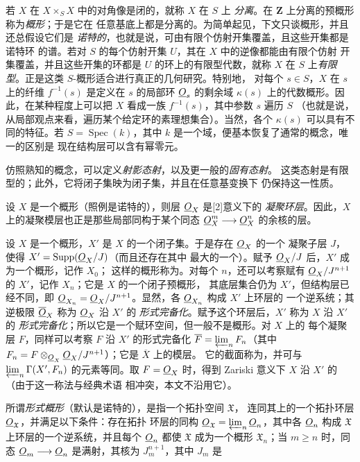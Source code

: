 若 $X$ 在 $X\times_S X$ 中的对角像是闭的，就称 $X$ 在 $S$ 上
\emph{分离}。在 $\mathbf Z$ 上分离的预概形称为\emph{概形}；于是它在
任意基底上都是分离的。为简单起见，下文只谈概形，并且还总假设它们是
\emph{诺特的}，也就是说，可由有限个仿射开集覆盖，且这些开集都是诺特环
的谱。若对 $S$ 的每个仿射开集 $U$，其在 $X$ 中的逆像都能由有限个仿射
开集覆盖，并且这些开集的环都是 $U$ 的环上的有限型代数，就称 $X$ 在
$S$ 上\emph{有限型}。正是这类 $S$-概形适合进行真正的几何研究。特别地，
对每个 $s\in S$，$X$ 在 $s$ 上的纤维 $f^{-1}(s)$ 是定义在 $s$ 的局部环
$\underline{O}_s$ 的剩余域 $\kappa(s)$ 上的代数概形。因此，在某种程度上可以把
$X$ 看成一族 $f^{-1}(s)$，其中参数 $s$ 遍历 $S$
（也就是说，从局部观点来看，遍历某个给定环的素理想集合）。当然，各个
$\kappa(s)$ 可以具有不同的特征。若 $S=\operatorname{Spec}(k)$，其中
$k$ 是一个域，便基本恢复了通常的概念，唯一的区别是
现在结构层可以含有幂零元。

仿照熟知的概念，可以定义\emph{射影态射}，以及更一般的\emph{固有态射}。
这类态射是有限型的；此外，它将闭子集映为闭子集，并且在任意基变换下
仍保持这一性质。

设 $X$ 是一个概形（照例是诺特的），则层 $\underline{O}_X$ 是[2]意义下的
\emph{凝聚环层}。因此，$X$ 上的凝聚模层也正是那些局部同构于某个同态
$\underline{O}_X^{m}\longrightarrow\underline{O}_X^{n}$ 的余核的层。


设 $X$ 是一个概形，$X'$ 是 $X$ 的一个闭子集。于是存在 $\underline{O}_X$ 的一个
凝聚子层 $J$，使得 $X'=\operatorname{Supp}(\underline{O}_X/J)$（而且还存在其中
最大的一个）。赋予 $\underline{O}_X/J$ 后，$X'$ 成为一个概形，记作 $X_0$；
这样的概形称为。对每个 $n$，还可以考察赋有
$\underline{O}_X/J^{n+1}$ 的 $X'$，记作 $X_n$；它是 $X$ 的一个闭子预概形，
其底层集合仍为 $X'$，但结构层已经不同，即
$\underline{O}_{X_n}=\underline{O}_X/J^{n+1}$。显然，各 $\underline{O}_{X_n}$ 构成 $X'$ 上环层的
一个逆系统；其逆极限 $\overline{\underline{O}}_X$ 称为 $\underline{O}_X$ 沿 $X'$ 的
\emph{形式完备化}。赋予这个环层后，$X'$ 称为 $X$ 沿 $X'$ 的
\emph{形式完备化}；所以它是一个赋环空间，但一般不是概形。对 $X$ 上的
每个凝聚层 $F$，同样可以考察 $F$ 沿 $X'$ 的形式完备化
$\overline F=\varprojlim_n F_n$（其中
$F_n=F\otimes_{\underline{O}_X}\underline{O}_X/J^{n+1}$）；它是 $\overline X$ 上的模层。
它的截面称为，并可与
$\varprojlim_n\Gamma(X',F_n)$ 的元素等同。取 $F=\underline{O}_X$ 时，得到
Zariski 意义下 $X$ 沿 $X'$ 的（由于这一称法与经典术语
相冲突，本文不沿用它）。

所谓\emph{形式概形}（默认是诺特的），是指一个拓扑空间 $\mathfrak X$，
连同其上的一个拓扑环层 $\underline{O}_{\mathfrak X}$，并满足以下条件：存在拓扑
环层的同构
$\underline{O}_{\mathfrak X}=\varprojlim_n\underline{O}_n$，其中各 $\underline{O}_n$ 构成
$\mathfrak X$ 上环层的一个逆系统，并且每个 $\underline{O}_n$ 都使
$\mathfrak X$ 成为一个概形 $\mathfrak X_n$；当 $m\geq n$ 时，同态
$\underline{O}_m\longrightarrow\underline{O}_n$ 是满射，其核为 $J_m^{n+1}$，其中 $J_m$ 是

